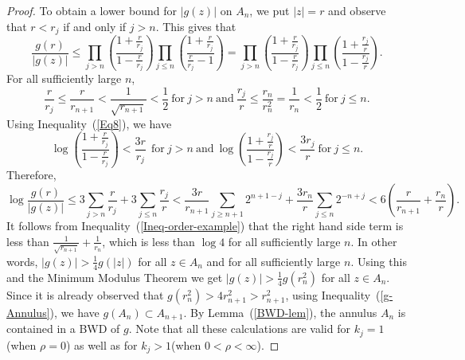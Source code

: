 \documentclass[11pt,a4paper]{article}
\begin{document}
\begin{proof}
	To obtain a lower bound for $|g(z)|$ on $A_n$, we put  $|z|=r$ and observe that $r<r_j$ if and only if $j >n$. This gives that $$\frac{g(r)}{|g(z)|}
	\leq \prod_{j>n}\left(\frac{{1+\frac{r}{r_j}}}{{1-\frac{r}{r_j}}}\right) \prod_{j\leq n}\left(\frac{{1+\frac{r}{r_j}}}{{ \frac{r}{r_j} -1}}\right) = \prod_{j>n}\left(\frac{{1+\frac{r}{r_j}}}{{1-\frac{r}{r_j}}}\right) \prod_{j\leq n}\left(\frac{{1+\frac{r_j}{r}}}{{1-\frac{r_j}{r}}}\right).$$ 
For all sufficiently large $n$, 
	\begin{equation}		 
\frac{r}{r_j}\leq \frac{r}{r_{n+1}}<\frac{1}{\sqrt{r_{n+1}}} < \frac{1}{2} ~\mbox{for}~ j>n ~\mbox{and}~\frac{r_j}{r}\leq \frac{r_n}{r_n ^2}=\frac{1}{ r_{n}}< \frac{1}{2} ~\mbox{for}~ j\leq n.
\label{Ineq-order-example}\end{equation}
	Using Inequality~(\ref{Eq8}), we have
	 $$\log\left(\frac{{1+\frac{r}{r_j}}}{{1-\frac{r}{r_j}}}\right)<\frac{3r}{r_j} ~~\mbox{for}~ j>n~\mbox{and}~ \log\left(\frac{{1+\frac{r_j}{r}}}{{1-\frac{r_j}{r}}}\right)<\frac{3r_j}{r} ~\mbox{for}~ j\leq n.$$ Therefore,  $$\log \frac{g(r)}{|g(z)|}\leq 3\sum_{j>n}\frac{r}{r_j}+3\sum_{j\leq n}\frac{r_j}{r}<\frac{3r}{r_{n+1}}\sum_{j \geq n+1} 2^{n+1-j}+ \frac{3r_n}{r} \sum_{j \leq n } 2^{-n+j}< 6\left(\frac{r}{r_{n+1}}+\frac{r_n}{r}\right).$$
It follows from Inequality~(\ref{Ineq-order-example}) that the right hand side term is less than 
$\frac{1}{\sqrt{r_{n+1}}}+ \frac{1}{r_n}$, which is less than $\log 4$
for all sufficiently large $n$.	  In other words,  $|g(z)|>\frac{1}{4}g(|z|)$ for all $z \in A_n$ and for all sufficiently large  $ n$. Using this and the Minimum Modulus Theorem we get $|g(z)|> \frac{1}{4}g(r_n ^2)$ for all $z \in A_n$. Since  it is already observed that $g(r_n^2)>4 r_{n+1}^2  >r^2_{n+1}$, using Inequality~(\ref{g-Annulus}), we have $g(A_n)\subset A_{n+1}$. By Lemma~(\ref{BWD-lem}),   the annulus $A_n$ is contained in a BWD of $g$. Note that all these calculations are valid for $k_j =1$ (when $\rho =0$) as well as for $k_j >1$(when $0< \rho <\infty$).
	

\end{proof}
\end{document}
